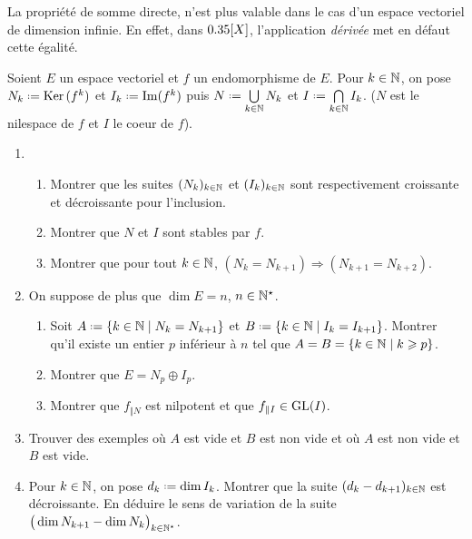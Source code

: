 \begin{remarque}
    La propriété de somme directe, n'est plus valable dans le cas d'un espace vectoriel de dimension infinie. En effet, dans $0.35[X]$, l'application \emph{dérivée} met en défaut cette égalité. 
\end{remarque}

\begin{exercice}
    Soient $E$ un espace vectoriel et $f$ un endomorphisme de $E$. Pour $k \in \mathbb{N}$, on pose $N_k \defeq \Ker(f^k)$ et $I_k \defeq \Im(f^k)$ puis $N \defeq \bigcup\limits_{k \in \N} N_k$ et $I \defeq \bigcap\limits_{k \in \N} I_k$. ($N$ est le nilespace de $f$ et $I$ le coeur de $f$).
    \begin{enumerate}
        \item 
        \begin{enumerate}
            \item Montrer que les suites $(N_k)_{k \in \mathbb{N}}$ et $(I_k)_{k \in \mathbb{N}}$ sont respectivement croissante et décroissante pour l'inclusion.
            \item Montrer que $N$ et $I$ sont stables par $f$. 
            \item Montrer que pour tout $k \in \mathbb{N}$, $(N_k = N_{k+1}) \Rightarrow (N_{k+1} = N_{k+2})$.
        \end{enumerate}
        \item On suppose de plus que $\dim E = n$, $n \in \mathbb{N}^\star$.
        \begin{enumerate}
            \item Soit $A \defeq \{ k \in \N \mid N_k = N_{k+1} \}$ et $B \defeq \{ k \in \N \mid I_k = I_{k+1} \}$. Montrer qu'il existe un entier $p$ inférieur à $n$ tel que $A = B =  \{ k \in \mathbb{N} \mid k \geqslant p \}$.
            \item Montrer que $E = N_p \oplus I_p$.
            \item Montrer que $f_{\Vert N}$ est nilpotent et que $f_{\Vert I} \in \mathrm{GL}(I)$.
        \end{enumerate}
        \item Trouver des exemples où $A$ est vide et $B$ est non vide et où $A$ est non vide et $B$ est vide.
        \item Pour $k \in \mathbb{N}$, on pose $d_k \defeq \dim I_k$. Montrer que la suite $(d_k - d_{k+1})_{k \in \mathbb{N}}$ est décroissante. En déduire le sens de variation de la suite $\big( \dim N_{k+1} - \dim N_k \big)_{k \in \mathbb{N}^\star}$.
    \end{enumerate}
\end{exercice}
